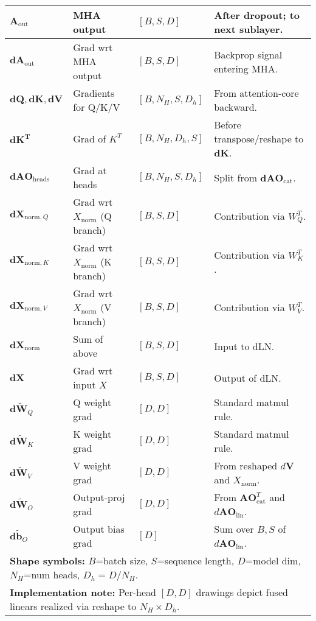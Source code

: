 \documentclass{article}
\begin{document}
\begin{center}
\begin{tabular}{llll}
$\mathbf{A}_{\text{out}}$    & MHA output                    & $[B,S,D]$       & After dropout; to next sublayer. \\
\hline
$\mathbf{dA}_{\text{out}}$   & Grad wrt MHA output           & $[B,S,D]$       & Backprop signal entering MHA. \\
$\mathbf{dQ},\mathbf{dK},\mathbf{dV}$ & Gradients for Q/K/V & $[B,N_H,S,D_h]$   & From attention-core backward. \\
$\mathbf{dK^T}$              & Grad of $K^T$                 & $[B,N_H,D_h,S]$   & Before transpose/reshape to $\mathbf{dK}$. \\
$\mathbf{dAO}_{\text{heads}}$& Grad at heads                 & $[B,N_H,S,D_h]$   & Split from $\mathbf{dAO}_{\text{cat}}$. \\
$\mathbf{dX}_{\text{norm},Q}$& Grad wrt $X_{\text{norm}}$ (Q branch) & $[B,S,D]$ & Contribution via $W_Q^T$. \\
$\mathbf{dX}_{\text{norm},K}$& Grad wrt $X_{\text{norm}}$ (K branch) & $[B,S,D]$ & Contribution via $W_K^T$. \\
$\mathbf{dX}_{\text{norm},V}$& Grad wrt $X_{\text{norm}}$ (V branch) & $[B,S,D]$ & Contribution via $W_V^T$. \\
$\mathbf{dX}_{\text{norm}}$  & Sum of above                  & $[B,S,D]$       & Input to dLN. \\
$\mathbf{dX}$                & Grad wrt input $X$            & $[B,S,D]$       & Output of dLN. \\
$\mathbf{d}\widetilde{\mathbf{W}}_{Q}$ & Q weight grad      & $[D,D]$         & Standard matmul rule. \\
$\mathbf{d}\widetilde{\mathbf{W}}_{K}$ & K weight grad      & $[D,D]$         & Standard matmul rule. \\
$\mathbf{d}\widetilde{\mathbf{W}}_{V}$ & V weight grad      & $[D,D]$         & From reshaped $d\mathbf{V}$ and $X_{\text{norm}}$. \\
$\mathbf{d}\widetilde{\mathbf{W}}_{O}$ & Output-proj grad   & $[D,D]$         & From $\mathbf{AO}_{\text{cat}}^T$ and $d\mathbf{AO}_{\text{lin}}$. \\
$\mathbf{d}\widetilde{\mathbf{b}}_{O}$ & Output bias grad   & $[D]$           & Sum over $B,S$ of $d\mathbf{AO}_{\text{lin}}$. \\
\hline
\multicolumn{4}{l}{\textbf{Shape symbols:}\; $B$=batch size,\; $S$=sequence length,\; $D$=model dim,\; $N_H$=num heads,\; $D_h=D/N_H$.} \\
\multicolumn{4}{l}{\textbf{Implementation note:}\; Per-head $[D,D]$ drawings depict fused linears realized via reshape to $N_H\times D_h$.} \\
\hline
\end{tabular}
\end{center}
\end{document}
